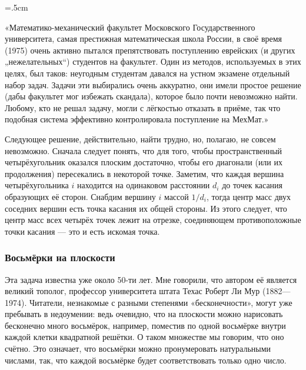 \medskip

\begin{trivlist}\leftskip=1cm\rightskip=.5cm
\item\relax«Математико-механический факультет Московского Государственного университета, самая престижная математическая школа России, в своё время (1975) очень активно пытался препятствовать поступлению еврейских (и других „нежелательных“) студентов на факультет.
Один из методов, используемых в этих целях, был таков: неугодным студентам давался на устном экзамене отдельный набор задач.
Задачи эти выбирались очень аккуратно, они имели простое решение (дабы факультет мог избежать скандала), которое было почти невозможно найти.
Любому, кто не решал задачу, могли с лёгкостью отказать в приёме, так что подобная система эффективно контролировала поступление на МехМат.» 
\end{trivlist}

\medskip

Следующее решение, действительно, найти трудно, но, полагаю, не совсем невозможно.
Сначала следует понять, что для того, чтобы пространственный четырёхугольник оказался плоским достаточно, чтобы его диагонали (или их продолжения) пересекались в некоторой точке.
Заметим, что каждая вершина четырёхугольника $i$ находится на одинаковом расстоянии $d_i$ до точек касания образующих её сторон.
Снабдим вершину $i$ массой $1/d_i$, тогда центр масс двух соседних вершин есть точка касания их общей стороны.
Из этого следует, что центр масс всех четырёх точек лежит на отрезке, соединяющем противоположные точки касания --- это и есть искомая точка.
\heart

\subsubsection*{Восьмёрки на плоскости}%

Эта задача известна уже около 50-ти лет.
Мне говорили, что автором её является великий тополог, профессор университета штата Техас Роберт Ли Мур (1882---1974). %
Читатели, незнакомые с разными степенями «бесконечности», могут уже пребывать в недоумении: ведь очевидно, что на плоскости можно нарисовать бесконечно много восьмёрок, например, поместив по одной восьмёрке внутри каждой клетки квадратной решётки.
О таком множестве мы говорим, что оно счётно. 
Это означает, что восьмёрки можно пронумеровать натуральными числами, так, что каждой восьмёрке будет соответствовать только одно число.

